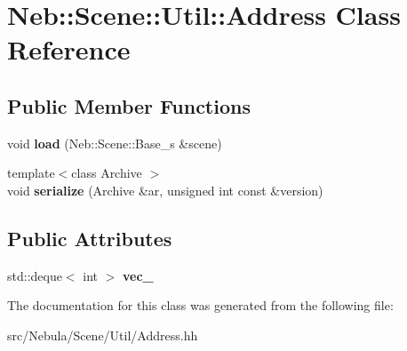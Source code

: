 \hypertarget{classNeb_1_1Scene_1_1Util_1_1Address}{\section{Neb\-:\-:Scene\-:\-:Util\-:\-:Address Class Reference}
\label{classNeb_1_1Scene_1_1Util_1_1Address}
}
\subsection*{Public Member Functions}
\begin{DoxyCompactItemize}
\item 
\hypertarget{classNeb_1_1Scene_1_1Util_1_1Address_ae4409eea6d35da7a354c011fe74fd94a}{void {\bfseries load} (Neb\-::\-Scene\-::\-Base\-\_\-s \&scene)}\label{classNeb_1_1Scene_1_1Util_1_1Address_ae4409eea6d35da7a354c011fe74fd94a}

\item 
\hypertarget{classNeb_1_1Scene_1_1Util_1_1Address_a7c3dfcdd9c073e169603fe44772df595}{{\footnotesize template$<$class Archive $>$ }\\void {\bfseries serialize} (Archive \&ar, unsigned int const \&version)}\label{classNeb_1_1Scene_1_1Util_1_1Address_a7c3dfcdd9c073e169603fe44772df595}

\end{DoxyCompactItemize}
\subsection*{Public Attributes}
\begin{DoxyCompactItemize}
\item 
\hypertarget{classNeb_1_1Scene_1_1Util_1_1Address_a98b29eceff22208c84aecf9e32bc6a49}{std\-::deque$<$ int $>$ {\bfseries vec\-\_\-}}\label{classNeb_1_1Scene_1_1Util_1_1Address_a98b29eceff22208c84aecf9e32bc6a49}

\end{DoxyCompactItemize}


The documentation for this class was generated from the following file\-:\begin{DoxyCompactItemize}
\item 
src/\-Nebula/\-Scene/\-Util/Address.\-hh\end{DoxyCompactItemize}
